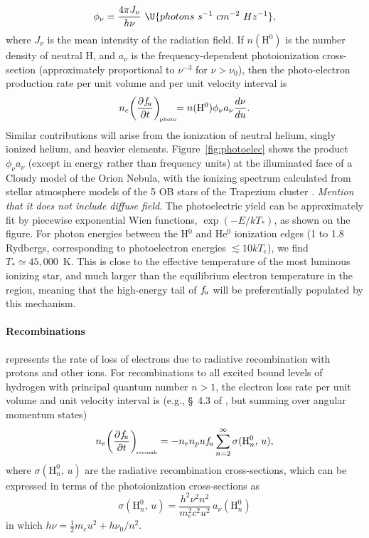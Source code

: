 \documentclass{emulateapj}
\newcommand\hii{\ion{H}{2}}
\begin{document}
\begin{equation}
  \label{eq:8}
  \phi_\nu = \frac{4\pi J_\nu}{h\nu} \ \U{photons\ s^{-1}\ cm^{-2} \ Hz^{-1}}, 
\end{equation}
where \(J_\nu\)
is the mean intensity of the radiation field.  If \(n(\mathrm{H^0})\)
is the number density of neutral H, and \( a_\nu \)
is the frequency-dependent photoionization cross-section
(approximately proportional to \(\nu^{-3}\)
for \(\nu > \nu_0\)),
then the photo-electron production rate per unit volume and per unit
velocity interval is
\begin{equation}
  \label{eq:6}
  n_e \biggl( \frac{\partial f_{\!u}}{\partial t} \biggr)_{\!\scriptscriptstyle\mathrm{photo}} \!\! = n(\mathrm{H^0})  \phi_\nu a_\nu \frac{d\nu}{d u} . 
\end{equation}
Similar contributions will arise from the ionization of neutral
helium, singly ionized helium, and heavier elements.
Figure~\ref{fig:photoelec} shows the product \(\phi_\nu a_\nu\)
(except in energy rather than frequency units) at the illuminated face
of a Cloudy model of the Orion Nebula, with the ionizing spectrum
calculated from stellar atmosphere models \citep{2003ApJS..146..417L}
of the 5 OB stars of the Trapezium cluster \citep{Ferland:2012a}.
\emph{Mention that it does not include diffuse field}.  The photoelectric
yield can be approximately fit by piecewise exponential Wien
functions, \(\exp(-E/k T_*)\),
as shown on the figure.  For photon energies between the H\(^0\)
and He\(^0\)
ionization edges (1 to 1.8 Rydbergs, corresponding to photoelectron
energies \(\lesssim 10 k T_e\)),
we find \(T_* \simeq 45,000\)~K\@.
This is close to the effective temperature of the most luminous
ionizing star, and much larger than the equilibrium electron
temperature in the \hii{} region, meaning that the high-energy tail of
\(f_{\!u}\) will be preferentially populated by this mechanism.

\paragraph{Recombinations}  represents the rate of loss
of electrons due to radiative recombination with protons and other
ions.  For recombinations to all excited bound levels of hydrogen with
principal quantum number \(n > 1\),
the electron loss rate per unit volume and unit velocity interval is
(e.g., \S~4.3 of \citealp{Ferland:2012a}, but summing over angular
momentum states)
\begin{equation}
  \label{eq:11}
  n_e \biggl( \frac{\partial f_{\!u}}{\partial t} \biggr)_{\!\scriptscriptstyle\mathrm{recomb}} = -n_e n_p u f_{\!u} \sum_{n=2}^\infty \sigma(\mathrm{H}^0_{n},\, u),  
\end{equation}
where \(\sigma(\mathrm{H}^0_{n},\, u)\) are the radiative recombination
cross-sections, which can be expressed in terms of the photoionization
cross-sections as 
\begin{equation}
  \label{eq:5}
  \sigma(\mathrm{H}^0_{n},\, u) =  \frac{h^2 \nu^2 n^2}{m_e^2 c^2 u^2} \, a_\nu(\mathrm{H}^0_{n})
\end{equation}
in which \(h\nu = \frac12 m_e u^2 + h\nu_0/n^2\). 
\end{document}
